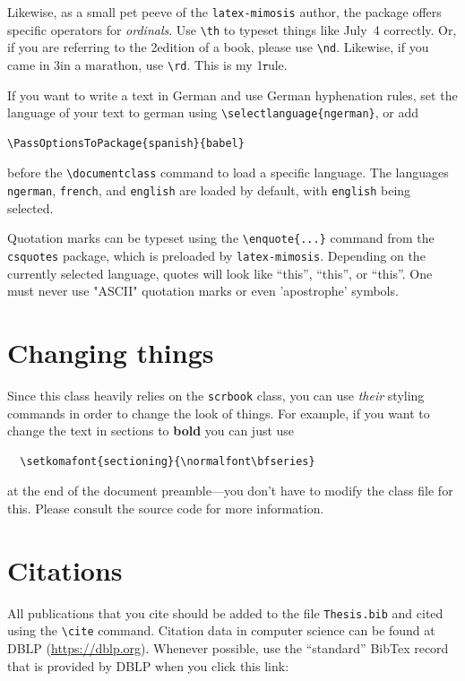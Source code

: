 Likewise, as a small pet peeve of the \texttt{latex-mimosis} author, the package offers specific operators for
\emph{ordinals}. Use \verb|\th| to typeset things like July~4\th
correctly. Or, if you are referring to the 2\nd edition of a book,
please use \verb|\nd|. Likewise, if you came in 3\rd in a marathon, use
\verb|\rd|. This is my 1\st rule.

If you want to write a text in German and use German hyphenation rules, set the language of your text to german using \verb|\selectlanguage{ngerman}|, or add
\begin{verbatim}
\PassOptionsToPackage{spanish}{babel}
\end{verbatim}
before the \verb|\documentclass| command to load a specific language. The languages \verb|ngerman|, \verb|french|, and \verb|english| are loaded by default, with \verb|english| being selected.

Quotation marks can be typeset using the \verb|\enquote{...}| command from the \verb|csquotes| package, which is preloaded by \verb|latex-mimosis|.
Depending on the currently selected language, quotes will look like \enquote{this},
\enquote{this},
or
\enquote{this}.
One must never use "ASCII" quotation marks or even 'apostrophe' symbols.

\section{Changing things}

Since this class heavily relies on the \verb|scrbook| class, you can use
\emph{their} styling commands in order to change the look of things. For
example, if you want to change the text in sections to \textbf{bold} you
can just use
%
\begin{verbatim}
  \setkomafont{sectioning}{\normalfont\bfseries}
\end{verbatim}
%
at the end of the document preamble---you don't have to modify the class
file for this. Please consult the source code for more information.

\section{Citations}

All publications that you cite should be added to the file \verb|Thesis.bib| and cited using the \verb|\cite| command.
Citation data in computer science can be found at DBLP \mbox{(\url{https://dblp.org})}.
Whenever possible, use the \enquote{standard} BibTex record that is provided by DBLP when you click this link:

